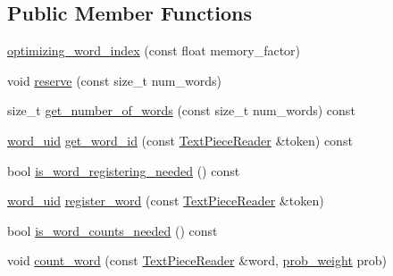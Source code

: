 \subsection*{Public Member Functions}
\begin{DoxyCompactItemize}
\item 
\hyperlink{classuva_1_1smt_1_1bpbd_1_1server_1_1lm_1_1dictionary_1_1optimizing__word__index_a0bf2e2ba600dd82b71cf5d12e6272cae}{optimizing\+\_\+word\+\_\+index} (const float memory\+\_\+factor)
\item 
void \hyperlink{classuva_1_1smt_1_1bpbd_1_1server_1_1lm_1_1dictionary_1_1optimizing__word__index_a38947d043d61a3f9a5acebf79c8e5f02}{reserve} (const size\+\_\+t num\+\_\+words)
\item 
size\+\_\+t \hyperlink{classuva_1_1smt_1_1bpbd_1_1server_1_1lm_1_1dictionary_1_1optimizing__word__index_a683624c90e23d3d821ffa637a87a1d4c}{get\+\_\+number\+\_\+of\+\_\+words} (const size\+\_\+t num\+\_\+words) const 
\item 
\hyperlink{namespaceuva_1_1smt_1_1bpbd_1_1server_a6bfe45ba344d65a7fdd7d26156328ddc}{word\+\_\+uid} \hyperlink{classuva_1_1smt_1_1bpbd_1_1server_1_1lm_1_1dictionary_1_1optimizing__word__index_ac67fcfdac97713861509c325a3949c96}{get\+\_\+word\+\_\+id} (const \hyperlink{classuva_1_1utils_1_1file_1_1_text_piece_reader}{Text\+Piece\+Reader} \&token) const 
\item 
bool \hyperlink{classuva_1_1smt_1_1bpbd_1_1server_1_1lm_1_1dictionary_1_1optimizing__word__index_a0da36615a46a9f9112d376961c379e1c}{is\+\_\+word\+\_\+registering\+\_\+needed} () const 
\item 
\hyperlink{namespaceuva_1_1smt_1_1bpbd_1_1server_a6bfe45ba344d65a7fdd7d26156328ddc}{word\+\_\+uid} \hyperlink{classuva_1_1smt_1_1bpbd_1_1server_1_1lm_1_1dictionary_1_1optimizing__word__index_a72d40fe3c0171a4f71b30d74d36e9524}{register\+\_\+word} (const \hyperlink{classuva_1_1utils_1_1file_1_1_text_piece_reader}{Text\+Piece\+Reader} \&token)
\item 
bool \hyperlink{classuva_1_1smt_1_1bpbd_1_1server_1_1lm_1_1dictionary_1_1optimizing__word__index_ae4996023eca522ac632145dd58b411ed}{is\+\_\+word\+\_\+counts\+\_\+needed} () const 
\item 
void \hyperlink{classuva_1_1smt_1_1bpbd_1_1server_1_1lm_1_1dictionary_1_1optimizing__word__index_ab9dbf77194d1bda426c967adacbe93e2}{count\+\_\+word} (const \hyperlink{classuva_1_1utils_1_1file_1_1_text_piece_reader}{Text\+Piece\+Reader} \&word, \hyperlink{namespaceuva_1_1smt_1_1bpbd_1_1server_a01e9ea4de9c226f4464862e84ff0bbcc}{prob\+\_\+weight} prob)

\end{DoxyCompactItemize}
